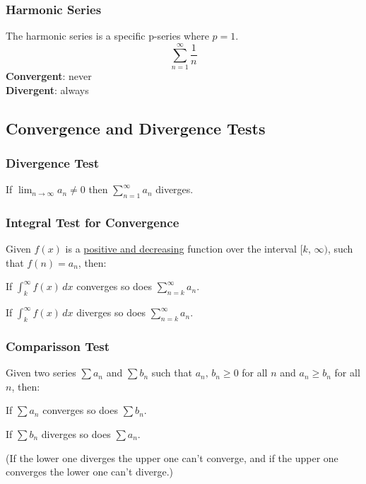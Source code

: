 \documentclass[12pt]{article}
\begin{document}
            \subsubsection{Harmonic Series}
                The harmonic series is a specific p-series where $p=1$.
                \[ \sum_{n=1}^\infty \frac{1}{n} \]
                \textbf{Convergent}: never
                \\ \textbf{Divergent}: always

        \subsection{Convergence and Divergence Tests}
            \subsubsection{Divergence Test}
                If $\displaystyle \lim_{n \to \infty} a_n \ne 0$ then $\displaystyle \sum_{n=1}^\infty a_n$ diverges.

            \subsubsection{Integral Test for Convergence}
                Given $f(x)$ is a \underline{positive and decreasing} function over the interval $[k, \, \infty)$, such that $f(n) = a_n$, then:

                \noindent If $\displaystyle \int_k^\infty f(x) \, dx$ converges so does $\displaystyle \sum_{n=k}^\infty a_n$.

                \noindent If $\displaystyle \int_k^\infty f(x) \, dx$ diverges so does $\displaystyle \sum_{n=k}^\infty a_n$.

            \subsubsection{Comparisson Test}
                Given two series $\displaystyle \sum a_n$ and $\displaystyle \sum b_n$ such that $a_n, \, b_n \ge 0$ for all $n$ and $a_n \ge b_n$ for all $n$, then:

                \noindent If $\displaystyle \sum a_n$ converges so does $\displaystyle \sum b_n$.

                \noindent If $\displaystyle \sum b_n$ diverges so does $\displaystyle \sum a_n$.

                \noindent (If the lower one diverges the upper one can't converge, and if the upper one converges the lower one can't diverge.)
\end{document}

